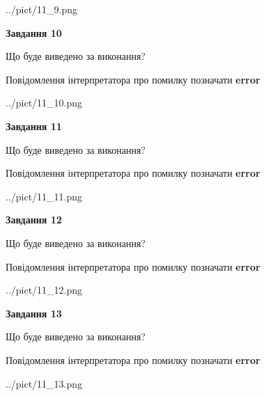 \documentclass[11pt, ukrainian]{article}
\begin{document}
{\begin {large}
\begin{center}
	{../pict/11_9.png}
\end{center}
\newpage

{\begin {center}\textbf{Завдання 10}\end {center}}\par
Що буде виведено за виконання? \par
Повідомлення інтерпретатора про помилку позначати \textbf{error}

\begin{center}
	{../pict/11_10.png}
\end{center}
\newpage

{\begin {center}\textbf{Завдання 11}\end {center}}\par
Що буде виведено за виконання? \par
Повідомлення інтерпретатора про помилку позначати \textbf{error}

\begin{center}
	{../pict/11_11.png}
\end{center}
\newpage

{\begin {center}\textbf{Завдання 12}\end {center}}\par
Що буде виведено за виконання? \par
Повідомлення інтерпретатора про помилку позначати \textbf{error}

\begin{center}
	{../pict/11_12.png}
\end{center}
\newpage

{\begin {center}\textbf{Завдання 13}\end {center}}\par
Що буде виведено за виконання? \par
Повідомлення інтерпретатора про помилку позначати \textbf{error}

\begin{center}
	{../pict/11_13.png}
\end{center}
\newpage


\end{large}}
\end{document}
